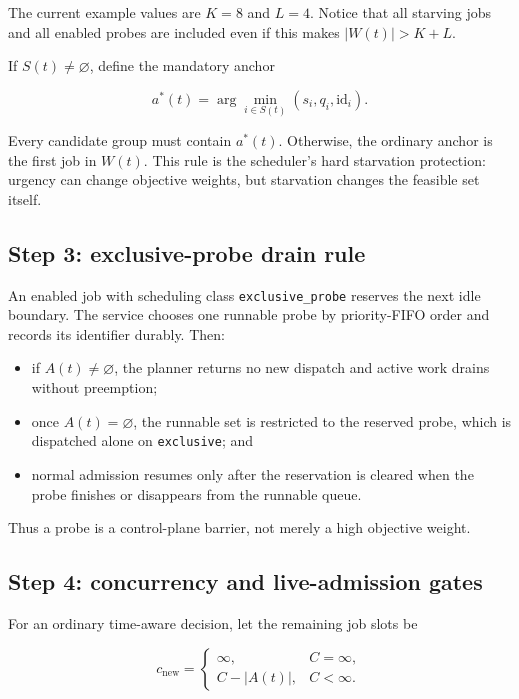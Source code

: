 \documentclass[11pt]{article}
\newcommand{\code}[1]{\textcolor{codeblue}{\texttt{#1}}}
\begin{document}
The current example values are $K=8$ and $L=4$.  Notice that all starving jobs
and all enabled probes are included even if this makes $|W(t)|>K+L$.

If $S(t)\ne\varnothing$, define the mandatory anchor

\begin{equation}
  a^*(t)=\arg\min_{i\in S(t)}(s_i,q_i,\mathrm{id}_i).
  \label{eq:mandatory-anchor}
\end{equation}

Every candidate group must contain $a^*(t)$.  Otherwise, the ordinary anchor is
the first job in $W(t)$.  This rule is the scheduler's hard starvation
protection: urgency can change objective weights, but starvation changes the
feasible set itself.

\subsection{Step 3: exclusive-probe drain rule}

An enabled job with scheduling class \code{exclusive\_probe} reserves the next
idle boundary.  The service chooses one runnable probe by priority-FIFO order
and records its identifier durably.  Then:

\begin{itemize}[leftmargin=*]
  \item if $A(t)\ne\varnothing$, the planner returns no new dispatch and active
        work drains without preemption;
  \item once $A(t)=\varnothing$, the runnable set is restricted to the reserved
        probe, which is dispatched alone on \code{exclusive}; and
  \item normal admission resumes only after the reservation is cleared when the
        probe finishes or disappears from the runnable queue.
\end{itemize}

Thus a probe is a control-plane barrier, not merely a high objective weight.

\subsection{Step 4: concurrency and live-admission gates}

For an ordinary time-aware decision, let the remaining job slots be

\begin{equation}
  c_{\mathrm{new}}=
  \begin{cases}
    \infty, & C=\infty,\\
    C-|A(t)|, & C<\infty.
  \end{cases}
  \label{eq:remaining-slots}
\end{equation}
\end{document}
